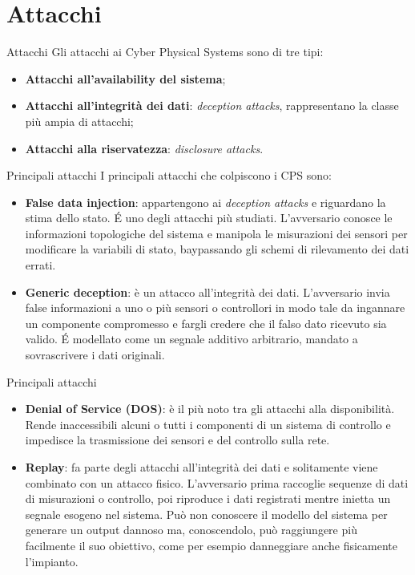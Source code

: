 \documentclass{beamer}
\begin{document}
\section{Attacchi}

\begin{frame}{Attacchi}
Gli attacchi ai Cyber Physical Systems sono di tre tipi:
\begin{itemize}
    \item \textbf{Attacchi all'availability del sistema}; 
    \item \textbf{Attacchi all'integrità dei dati}: \textit{deception attacks}, rappresentano la classe più ampia di attacchi;
    \item \textbf{Attacchi alla riservatezza}: \textit{disclosure attacks}.
\end{itemize}

\end{frame}

\begin{frame}{Principali attacchi}
I principali attacchi che colpiscono i CPS sono:
\begin{itemize}
    \item \textbf{False data injection}: appartengono ai \textit{deception attacks} e riguardano la stima dello stato. \'E uno degli attacchi più studiati. 
    L'avversario conosce le informazioni topologiche del sistema e manipola le misurazioni dei sensori per modificare la variabili di stato, 
    baypassando gli schemi di rilevamento dei dati errati.
    \item \textbf{Generic deception}: è un attacco all'integrità dei dati. L'avversario invia false informazioni a uno o più sensori o controllori 
    in modo tale da ingannare un componente compromesso e fargli credere che il falso dato ricevuto sia valido.
    \'E modellato come un segnale additivo arbitrario, mandato a sovrascrivere i dati originali.
\end{itemize}
\end{frame}

\begin{frame}{Principali attacchi}
\begin{itemize}
    \item \textbf{Denial of Service (DOS)}: è il più noto tra gli attacchi alla disponibilità. Rende inaccessibili alcuni o tutti i componenti di un 
    sistema di controllo e impedisce la trasmissione dei sensori e del controllo sulla rete.
    \item \textbf{Replay}: fa parte degli attacchi all'integrità dei dati e solitamente viene combinato con un attacco fisico. L'avversario prima 
    raccoglie sequenze di dati di misurazioni o controllo, poi riproduce i dati registrati mentre inietta un segnale esogeno nel sistema. 
    Può non conoscere il modello del sistema per generare un output dannoso ma, conoscendolo, può raggiungere più facilmente il suo obiettivo, 
    come per esempio danneggiare anche fisicamente l'impianto.
\end{itemize}
\end{frame}
\end{document}
